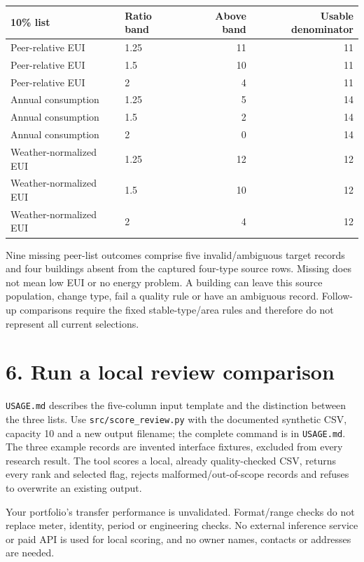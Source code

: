 \documentclass[10pt,letterpaper]{article}
\begin{document}
\begin{center}\small\begin{tabular}{llrr}\toprule
10\% list & Ratio band & Above band & Usable denominator\\\midrule
Peer-relative EUI & 1.25 & 11 & 11 \\
Peer-relative EUI & 1.5 & 10 & 11 \\
Peer-relative EUI & 2 & 4 & 11 \\
Annual consumption & 1.25 & 5 & 14 \\
Annual consumption & 1.5 & 2 & 14 \\
Annual consumption & 2 & 0 & 14 \\
Weather-normalized EUI & 1.25 & 12 & 12 \\
Weather-normalized EUI & 1.5 & 10 & 12 \\
Weather-normalized EUI & 2 & 4 & 12 \\
\bottomrule\end{tabular}\end{center}

Nine missing peer-list outcomes comprise five invalid/ambiguous target records and four buildings absent from the captured four-type source rows. Missing does not mean low EUI or no energy problem. A building can leave this source population, change type, fail a quality rule or have an ambiguous record. Follow-up comparisons require the fixed stable-type/area rules and therefore do not represent all current selections.

\section*{6. Run a local review comparison}
{\raggedright \texttt{USAGE.md} describes the five-column input template and the distinction between the three lists. Use \texttt{src/score\_review.py} with the documented synthetic CSV, capacity 10 and a new output filename; the complete command is in \texttt{USAGE.md}. The three example records are invented interface fixtures, excluded from every research result. The tool scores a local, already quality-checked CSV, returns every rank and selected flag, rejects malformed/out-of-scope records and refuses to overwrite an existing output.\par}

Your portfolio's transfer performance is unvalidated. Format/range checks do not replace meter, identity, period or engineering checks. No external inference service or paid API is used for local scoring, and no owner names, contacts or addresses are needed.
\end{document}
